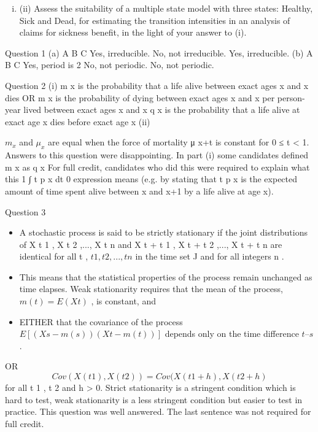 \documentclass[a4paper,12pt]{article}
\begin{document}
\begin{enumerate}
\begin{enumerate}[(i)]
\item (ii) Assess the suitability of a multiple state model with three states: Healthy, Sick
and Dead, for estimating the transition intensities in an analysis of claims for
sickness benefit, in the light of your answer to (i).

\end{enumerate}
\newpage
Question 1
(a) A
B
C Yes, irreducible.
No, not irreducible.
Yes, irreducible.
(b) A
B
C Yes, period is 2
No, not periodic.
No, not periodic.

Question 2
(i)
m x is the probability that a life alive between exact ages x and x dies
OR
m x is the probability of dying between exact ages x and x per person-year lived
between exact ages x and x
q x is the probability that a life alive at exact age x dies before exact age x
(ii)

$m_x$ and $μ_x$ are equal when the force of mortality μ x+t is constant for 0 ≤ t < 1.
Answers to this question were disappointing. In part (i) some candidates defined m x as
q x
For full credit, candidates who did this were required to explain what this
1
∫ t p x dt
0
expression means (e.g. by stating that t p x is the expected amount of time spent alive between
x and x+1 by a life alive at age x).
\newpage

Question 3
\begin{itemize}
\item A stochastic process is said to be strictly stationary if the joint distributions of
X t 1 , X t 2 ,..., X t n and X t + t 1 , X t + t 2 ,..., X t + t n are identical for all t , $t 1 , t 2 ,..., t n$ in the time set J and
for all integers n .
\item This means that the statistical properties of the process remain unchanged as time elapses.
Weak stationarity requires that the mean of the process, $m ( t ) = E ( X t )$ , is constant, and

\item EITHER that the covariance of the process $E [( X s − m ( s ))( X t − m ( t ))]$ depends only on the
time difference $t – s$ .
\end{itemize}
OR \[Cov( X ( t 1 ), X ( t 2 )) = Cov( X ( t 1 + h ), X ( t 2 + h )\] for all t 1 , t 2 and h > 0.
Strict stationarity is a stringent condition which is hard to test, weak stationarity is a less
stringent condition but easier to test in practice.
This question was well answered. The last sentence was not required for full credit.


\end{enumerate}
\end{document}
